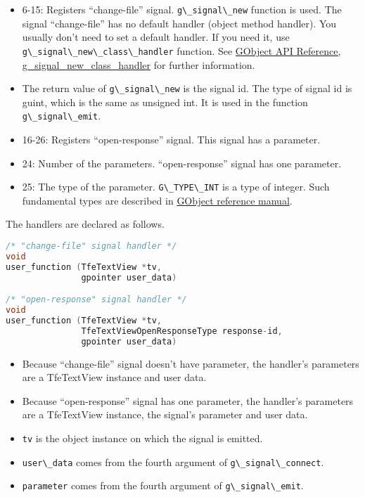 \begin{itemize}
\tightlist
\item
  6-15: Registers ``change-file'' signal.
  \passthrough{\lstinline!g\_signal\_new!} function is used. The signal
  ``change-file'' has no default handler (object method handler). You
  usually don't need to set a default handler. If you need it, use
  \passthrough{\lstinline!g\_signal\_new\_class\_handler!} function. See
  \href{https://docs.gtk.org/gobject/func.signal_new_class_handler.html}{GObject
  API Reference, g\_signal\_new\_class\_handler} for further
  information.
\item
  The return value of \passthrough{\lstinline!g\_signal\_new!} is the
  signal id. The type of signal id is guint, which is the same as
  unsigned int. It is used in the function
  \passthrough{\lstinline!g\_signal\_emit!}.
\item
  16-26: Registers ``open-response'' signal. This signal has a
  parameter.
\item
  24: Number of the parameters. ``open-response'' signal has one
  parameter.
\item
  25: The type of the parameter. \passthrough{\lstinline!G\_TYPE\_INT!}
  is a type of integer. Such fundamental types are described in
  \href{https://developer-old.gnome.org/gobject/stable/gobject-Type-Information.html}{GObject
  reference manual}.
\end{itemize}

The handlers are declared as follows.

\begin{lstlisting}[language=C]
/* "change-file" signal handler */
void
user_function (TfeTextView *tv,
               gpointer user_data)

/* "open-response" signal handler */
void
user_function (TfeTextView *tv,
               TfeTextViewOpenResponseType response-id,
               gpointer user_data)
\end{lstlisting}

\begin{itemize}
\tightlist
\item
  Because ``change-file'' signal doesn't have parameter, the handler's
  parameters are a TfeTextView instance and user data.
\item
  Because ``open-response'' signal has one parameter, the handler's
  parameters are a TfeTextView instance, the signal's parameter and user
  data.
\item
  \passthrough{\lstinline!tv!} is the object instance on which the
  signal is emitted.
\item
  \passthrough{\lstinline!user\_data!} comes from the fourth argument of
  \passthrough{\lstinline!g\_signal\_connect!}.
\item
  \passthrough{\lstinline!parameter!} comes from the fourth argument of
  \passthrough{\lstinline!g\_signal\_emit!}.
\end{itemize}


